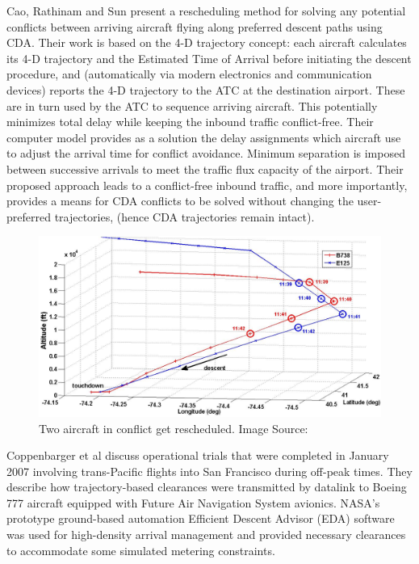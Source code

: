 \documentclass{aer1315-pretty}
\begin{document}
Cao, Rathinam and Sun \cite{Cao:2011} present a rescheduling method for solving any potential conflicts between arriving aircraft flying along preferred descent paths using CDA. Their work is based on the 4-D trajectory concept: each aircraft calculates its 4-D trajectory and the Estimated Time of Arrival before initiating the descent procedure, and (automatically via modern electronics and communication devices) reports the 4-D trajectory to the ATC at the destination airport. These are in turn used by the ATC to sequence arriving aircraft. This potentially minimizes total delay while keeping the inbound traffic conflict-free. Their computer model provides as a solution the delay assignments which aircraft use to adjust the arrival time for conflict avoidance. Minimum separation is imposed between successive arrivals to meet the traffic flux capacity of the airport. Their proposed approach leads to a conflict-free inbound traffic, and more importantly, provides a means for CDA conflicts to be solved without changing the user-preferred trajectories, (hence CDA trajectories remain intact). \par

\begin{figure}[!h]
\centering
\includegraphics[height=0.4\textwidth]{figures/reschedule.jpg}
	\caption{Two aircraft in conflict get rescheduled. Image Source: \cite{Cao:2011}}	
	\label{fig:Rescheduled_Aircraft}
\end{figure}

Coppenbarger et al \cite{Copp:2007} discuss operational trials that were completed in January 2007 involving trans-Pacific flights into San Francisco during off-peak times. They describe how trajectory-based clearances were transmitted by datalink to Boeing 777 aircraft equipped with Future Air Navigation System avionics. NASA’s prototype ground-based automation Efficient Descent Advisor (EDA) software was  used for high-density arrival management and provided necessary clearances to accommodate some simulated metering constraints. \par
\end{document}
